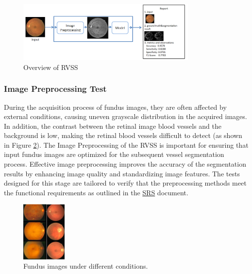 \documentclass[12pt, titlepage]{article}
\begin{document}
\begin{figure}[h!]
\begin{center}
\includegraphics[width=0.80\textwidth]{overview}
\caption{Overview of RVSS}
\label{Fig_overview} 
\end{center}
\end{figure}


\subsubsection{Image Preprocessing Test}
\label{image_preprocessing}
During the acquisition process of fundus images, they are often affected by external conditions, causing uneven grayscale distribution in the acquired images. In addition, the contrast between the retinal image blood vessels and the background is low, making the retinal blood vessels difficult to detect (as shown in Figure \ref{fundus}). The Image Preprocessing of the RVSS is important for ensuring that input fundus images are optimized for the subsequent vessel segmentation process. Effective image preprocessing improves the accuracy of the segmentation results by enhancing image quality and standardizing image features. The tests designed for this stage are tailored to verify that the preprocessing methods meet the functional requirements as outlined in the \href{https://github.com/lele0007/Blood-vessel-segmentation/blob/main/docs/SRS/SRS.pdf}{SRS} document.

\begin{figure}[h!]
\begin{center}
\includegraphics[width=0.20\textwidth]{fundus}
\caption{
Fundus images under different conditions.}
\label{fundus} 
\end{center}
\end{figure}
\end{document}
